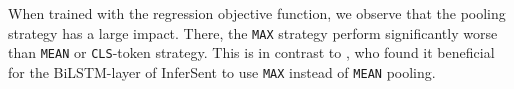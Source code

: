 \documentclass[11pt,a4paper]{article}
\begin{document}
When trained with the regression objective function, we observe that the pooling strategy has a large impact. There, the \texttt{MAX} strategy perform significantly worse than \texttt{MEAN} or \texttt{CLS}-token strategy. This is in contrast to \cite{conneau2017infersent}, who found it beneficial for the BiLSTM-layer of InferSent to use \texttt{MAX} instead of \texttt{MEAN} pooling. 



% 
% 
% 
% 
% 
\end{document}

